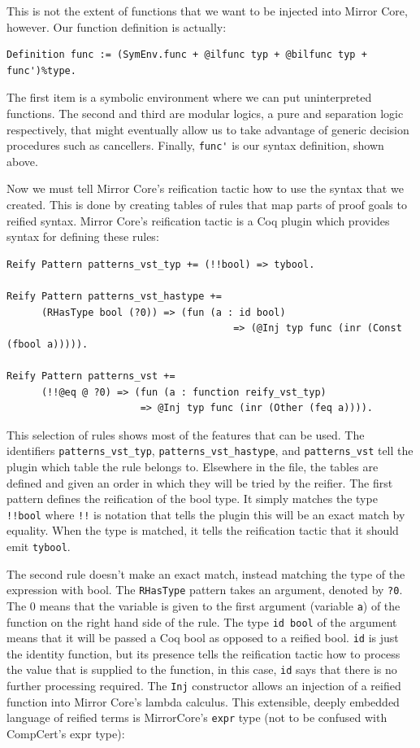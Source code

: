\documentclass{puthesis}
\begin{document}
This is not the extent of functions that we want to be injected into
Mirror Core, however. Our function definition is actually:

\begin{lstlisting}
Definition func := (SymEnv.func + @ilfunc typ + @bilfunc typ + func')%type.
\end{lstlisting}

The first item is a symbolic environment where we can put
uninterpreted functions. The second and third are modular logics, a
pure and separation logic respectively, that might eventually allow us
to take advantage of generic decision procedures such as
cancellers. Finally, \lstinline|func'| is our syntax definition, shown
above.

Now we must tell Mirror Core's reification tactic
\cite[section~4.4.1]{malecha:thesis} how to use the syntax that we
created. This is done by creating tables of rules that map parts of
proof goals to reified syntax. Mirror Core's reification tactic is a
Coq plugin which provides syntax for defining these rules:

\begin{lstlisting}
Reify Pattern patterns_vst_typ += (!!bool) => tybool.

Reify Pattern patterns_vst_hastype += 
      (RHasType bool (?0)) => (fun (a : id bool) 
                                       => (@Inj typ func (inr (Const (fbool a))))).

Reify Pattern patterns_vst += 
      (!!@eq @ ?0) => (fun (a : function reify_vst_typ) 
                       => @Inj typ func (inr (Other (feq a)))).
\end{lstlisting}

This selection of rules shows most of the features that can be
used. The identifiers \lstinline|patterns_vst_typ|,
\lstinline|patterns_vst_hastype|, and \lstinline|patterns_vst| tell the
plugin which table the rule belongs to. Elsewhere in the file, the
tables are defined and given an order in which they will be tried by
the reifier. The first pattern defines the reification of the bool
type. It simply matches the type \lstinline|!!bool| where
\lstinline|!!| is notation that tells the plugin this will be an exact
match by equality. When the type is matched, it tells the reification
tactic that it should emit \lstinline|tybool|.

The second rule doesn't make an exact match, instead matching the type
of the expression with bool. The \lstinline|RHasType| pattern takes an
argument, denoted by \lstinline|?0|. The 0 means that the variable is
given to the first argument (variable \lstinline|a|) of the function
on the right hand side of the rule. The type \lstinline|id bool| of
the argument means that it will be passed a Coq bool as opposed to a
reified bool. \lstinline|id| is just the identity function, but its
presence tells the reification tactic how to process the value that is
supplied to the function, in this case, \lstinline|id| says that there
is no further processing required.  The \lstinline|Inj| constructor
allows an injection of a reified function into Mirror Core's lambda
calculus. This extensible, deeply embedded language of reified terms
is MirrorCore's \lstinline{expr} type
(not to be confused with CompCert's expr type):
\end{document}
